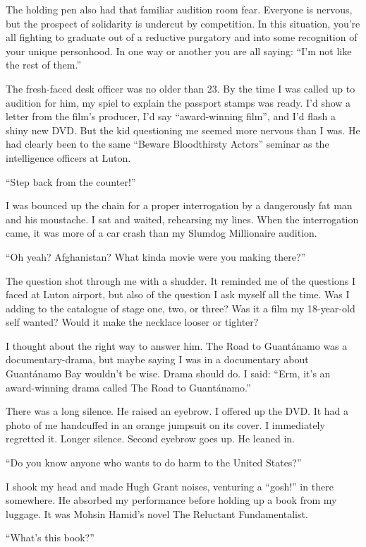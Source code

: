 \documentclass[10pt,a4paper]{article}
\begin{document}
The holding pen also had that familiar audition room fear. Everyone is nervous, but the prospect of solidarity is undercut by competition. In this situation, you’re all fighting to graduate out of a reductive purgatory and into some recognition of your unique personhood. In one way or another you are all saying: “I’m not like the rest of them.”

The fresh-faced desk officer was no older than 23. By the time I was called up to audition for him, my spiel to explain the passport stamps was ready. I’d show a letter from the film’s producer, I’d say “award-winning film”, and I’d flash a shiny new DVD. But the kid questioning me seemed more nervous than I was. He had clearly been to the same “Beware Bloodthirsty Actors” seminar as the intelligence officers at Luton.

“Step back from the counter!”

I was bounced up the chain for a proper interrogation by a dangerously fat man and his moustache. I sat and waited, rehearsing my lines. When the interrogation came, it was more of a car crash than my Slumdog Millionaire audition.

“Oh yeah? Afghanistan? What kinda movie were you making there?”

The question shot through me with a shudder. It reminded me of the questions I faced at Luton airport, but also of the question I ask myself all the time. Was I adding to the catalogue of stage one, two, or three? Was it a film my 18-year-old self wanted? Would it make the necklace looser or tighter?

I thought about the right way to answer him. The Road to Guantánamo was a documentary-drama, but maybe saying I was in a documentary about Guantánamo Bay wouldn’t be wise. Drama should do. I said: “Erm, it’s an award-winning drama called The Road to Guantánamo.”

There was a long silence. He raised an eyebrow. I offered up the DVD. It had a photo of me handcuffed in an orange jumpsuit on its cover. I immediately regretted it. Longer silence. Second eyebrow goes up. He leaned in.

“Do you know anyone who wants to do harm to the United States?”

I shook my head and made Hugh Grant noises, venturing a “gosh!” in there somewhere. He absorbed my performance before holding up a book from my luggage. It was Mohsin Hamid’s novel The Reluctant Fundamentalist.

“What’s this book?”
\end{document}
